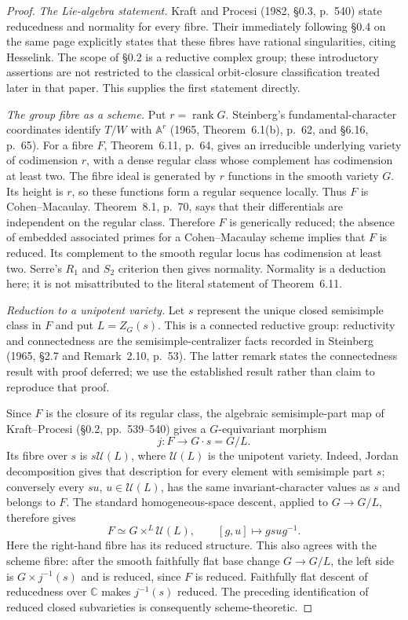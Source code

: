 \documentclass[11pt,a4paper]{article}
\theoremstyle{definition}\newtheorem{definition}[theorem]{Definition}
\theoremstyle{remark}\newtheorem{remark}[theorem]{Remark}
\begin{document}
\begin{proof}
\emph{The Lie-algebra statement.}
Kraft and Procesi (1982, \S0.3, p.~540) state reducedness and
normality for every fibre.  Their immediately following \S0.4 on
the same page explicitly states that these fibres have rational
singularities, citing Hesselink.  The scope of \S0.2 is a reductive
complex group; these introductory assertions are not restricted
to the classical orbit-closure classification treated later in that
paper.  This supplies the first statement directly.

\emph{The group fibre as a scheme.}
Put $r=\operatorname{rank}G$.  Steinberg's fundamental-character
coordinates identify $T/W$ with $\mathbb A^r$ (1965,
Theorem~6.1(b), p.~62, and \S6.16, p.~65).
For a fibre $F$, Theorem~6.11, p.~64, gives an irreducible
underlying variety of codimension $r$, with a dense regular class
whose complement has codimension at least two.
The fibre ideal is generated by $r$ functions in the smooth
variety $G$.  Its height is $r$, so these functions form a regular
sequence locally.  Thus $F$ is Cohen--Macaulay.  Theorem~8.1,
p.~70, says that their differentials are independent on the
regular class.  Therefore $F$ is generically reduced; the absence
of embedded associated primes for a Cohen--Macaulay scheme implies
that $F$ is reduced.  Its complement to the smooth regular locus
has codimension at least two.  Serre's $R_1$ and $S_2$ criterion
then gives normality.  Normality is a deduction here; it is not
misattributed to the literal statement of Theorem~6.11.

\emph{Reduction to a unipotent variety.}
Let $s$ represent the unique closed semisimple class in $F$ and
put $L=Z_G(s)$.  This is a connected reductive group: reductivity
and connectedness are the semisimple-centralizer facts recorded
in Steinberg (1965, \S2.7 and Remark~2.10, p.~53).  The latter
remark states the connectedness result with proof deferred; we
use the established result rather than claim to reproduce that
proof.

Since $F$ is the closure of its regular class, the algebraic
semisimple-part map of Kraft--Procesi (\S0.2, pp.~539--540) gives
a $G$-equivariant morphism
\[
 j:F\longrightarrow G\cdot s=G/L.
\]
Its fibre over $s$ is $s\mathcal U(L)$, where $\mathcal U(L)$ is
the unipotent variety.  Indeed, Jordan decomposition gives that
description for every element with semisimple part $s$; conversely
every $su$, $u\in\mathcal U(L)$, has the same invariant-character
values as $s$ and belongs to $F$.  The standard homogeneous-space
descent, applied to $G\to G/L$, therefore gives
\[
 F \simeq G\times^L \mathcal U(L),\qquad
 [g,u]\longmapsto gsu g^{-1}.
 \tag{SM23.1}
\]
Here the right-hand fibre has its reduced structure.  This also
agrees with the scheme fibre: after the smooth faithfully flat
base change $G\to G/L$, the left side is
$G\times j^{-1}(s)$ and is reduced, since $F$ is reduced.
Faithfully flat descent of reducedness over $\mathbb C$ makes
$j^{-1}(s)$ reduced.  The preceding identification of reduced
closed subvarieties is consequently scheme-theoretic.


\end{proof}
\end{document}
